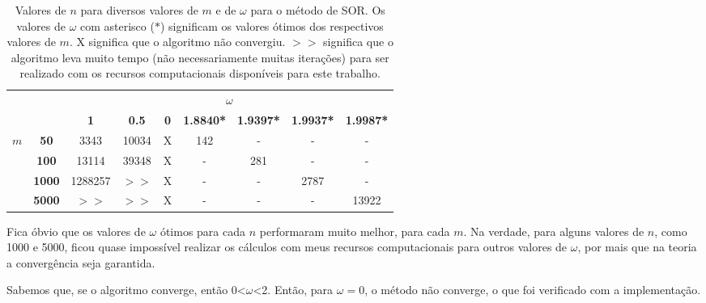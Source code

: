 \documentclass{article}
\begin{document}
\begin{enumerate}
\begin{enumerate}
                \begin{table}[!h]
                    \centering
                    \begin{tabular}{cc|c|c|c|c|c|c|c|}
                        \cline{3-9}
                                            &               & \multicolumn{7}{c|}{\textbf{$\omega$}}      \\ \cline{3-9} 
                        &
                        &
                        \textbf{1} &
                        \textbf{0.5} &
                        \textbf{0} &
                        \textbf{1.8840*} &
                        \textbf{1.9397*} &
                        \textbf{1.9937*} &
                        \textbf{1.9987*} \\ \hline
                        \multicolumn{1}{|c|}{\multirow{4}{*}{\textbf{$m$}}} &
                        \textbf{50} &
                        3343 &
                        10034 &
                        X &
                        142 &
                        - &
                        - &
                        - \\ \cline{2-9} 
                        \multicolumn{1}{|c|}{} & \textbf{100}  & 13114 & 39348 & X & - & 281 & -    & -     \\ \cline{2-9} 
                        \multicolumn{1}{|c|}{} & \textbf{1000} & 1288257 & $>>$ & X & - & -   & 2787 & -     \\ \cline{2-9} 
                        \multicolumn{1}{|c|}{} & \textbf{5000} & $>>$ & $>>$ & X & - & -   & -    & 13922 \\ \hline
                    \end{tabular}
                    \caption{Valores de $n$ para diversos valores de $m$ e de $\omega$ para o método de SOR. Os valores de $\omega$ com asterisco ($*$)
                    significam os valores ótimos dos respectivos valores de $m$. X significa que o algoritmo não convergiu. $>>$ significa que o algoritmo
                    leva muito tempo (não necessariamente muitas iterações) para ser realizado com os recursos computacionais disponíveis para este trabalho.}
                    \label{tab:omega_m}
                \end{table}

                Fica óbvio que os valores de $\omega$ ótimos para cada $n$ performaram muito melhor, para cada $m$.
                Na verdade, para alguns valores de $n$, como 1000 e 5000, ficou quase impossível realizar os cálculos com meus recursos computacionais para outros valores de $\omega$,
                por mais que na teoria a convergência seja garantida.
                
                Sabemos que, se o algoritmo converge, então 0<$\omega$<2. Então, para $\omega=0$, o
                método não converge, o que foi verificado com a implementação.
                
        \end{enumerate}
    \end{enumerate}
\end{document}
